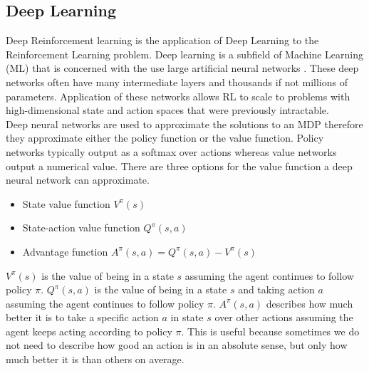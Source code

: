 \documentclass[10pt,journal,compsoc]{IEEEtran}
\begin{document}
\subsection{Deep Learning}
Deep Reinforcement learning is the application of Deep Learning to the Reinforcement Learning problem. Deep learning is a subfield of Machine Learning (ML) that is concerned with the use large artificial neural networks \cite{LeCun:DeepLearning}. These deep networks often have many intermediate layers and thousands if not millions of parameters. Application of these networks allows RL to scale to problems with high-dimensional state and action spaces that were previously intractable.
\\
Deep neural networks are used to approximate the solutions to an MDP therefore they approximate either the policy function or the value function. Policy networks typically output as a softmax over actions whereas value networks output a numerical value. There are three options for the value function a deep neural network can approximate.
\begin{itemize}
\item State value function \begin{math}V^\pi(s)\end{math}
\item State-action value function \begin{math}Q^\pi(s,a)\end{math}
\item Advantage function \begin{math}A^\pi(s,a)=Q^\pi(s,a)-V^\pi(s)\end{math}
\end{itemize}
\begin{math}V^\pi(s)\end{math} is the value of being in a state \begin{math}s\end{math} assuming the agent continues to follow policy \begin{math}\pi\end{math}. \begin{math}Q^\pi(s,a)\end{math} is the value of being in a state \begin{math}s\end{math} and taking action \begin{math}a\end{math} assuming the agent continues to follow policy \begin{math}\pi\end{math}. \begin{math}A^\pi(s,a)\end{math} describes how much better it is to take a specific action \begin{math}a\end{math}  in state \begin{math}s\end{math} over other actions assuming the agent keeps acting according to policy \begin{math}\pi\end{math}. This is useful because sometimes we do not need to describe how good an action is in an absolute sense, but only how much better it is than others on average.
\end{document}
